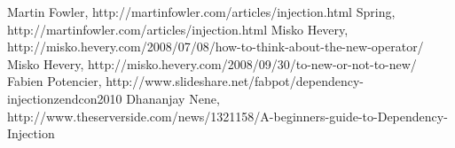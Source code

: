 \documentclass[a4paper,conference]{IEEEtran}
\begin{document}


%
%
%
\begin{thebibliography}{1}

Martin Fowler, http://martinfowler.com/articles/injection.html
Spring, http://martinfowler.com/articles/injection.html
Misko Hevery, http://misko.hevery.com/2008/07/08/how-to-think-about-the-new-operator/
Misko Hevery, http://misko.hevery.com/2008/09/30/to-new-or-not-to-new/
Fabien Potencier, http://www.slideshare.net/fabpot/dependency-injectionzendcon2010
Dhananjay Nene, http://www.theserverside.com/news/1321158/A-beginners-guide-to-Dependency-Injection

\end{thebibliography}




\end{document}
